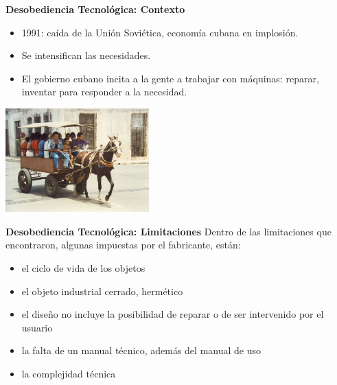 \documentclass[spanish]{beamer}
\begin{document}
\begin{frame}{\bf{Desobediencia Tecnológica}: Contexto}   
    \begin{itemize}        
        \item 1991: caída de la Unión Soviética, economía cubana en implosión.
        \item Se intensifican las necesidades.
        \item El gobierno cubano incita a la gente a trabajar con máquinas: reparar, inventar para responder a la necesidad.        
    \end{itemize}
    \begin{center}            
        \includegraphics[height=4cm]{img/periodo_especial.jpg}
    \end{center}
\end{frame}

\begin{frame}{\bf{Desobediencia Tecnológica}: Limitaciones}      
    Dentro de las limitaciones que encontraron, algunas impuestas por el fabricante, están:
    
    \begin{itemize}
        \item el ciclo de vida de los objetos 
        \item el objeto industrial cerrado, hermético
        \item el diseño no incluye la posibilidad de reparar o de ser intervenido por el usuario
        \item la falta de un manual técnico, además del manual de uso
        \item la complejidad técnica        
    \end{itemize}    
\end{frame}
\end{document}
